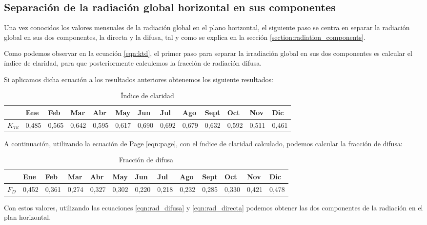\subsection{Separación de la radiación global horizontal en sus componentes}

Una vez conocidos los valores mensuales de la radiación global en el plano horizontal, el siguiente paso se centra en separar la radiación global en sus dos componentes, la directa y la difusa, tal y como se explica en la sección \ref{section:radiation_components}.

Como podemos observar en la ecuación \ref{eqn:ktd}, el primer paso para separar la irradiación global en sus dos componentes es calcular el índice de claridad, para que posteriormente calculemos la fracción de radiación difusa. 
\newpage

Si aplicamos dicha ecuación a los resultados anteriores obtenemos los siguiente resultados:

\begin{table}[ht]
\centering
\begin{tabular}{|l|l|l|l|l|l|l|l|l|l|l|l|l|}
\hline
    & Ene & Feb & Mar & Abr & May & Jun & Jul & Ago & Sept & Oct & Nov & Dic \\ \hline
$K_{Td}$ & 0,485 & 0,565 & 0,642 & 0,595 & 0,617 & 0,690 & 0,692 & 0,679 & 0,632 & 0,592 & 0,511  & 0,461  \\ \hline
\end{tabular}
\label{tab:clarity_index}
\caption{Índice de claridad}
\end{table}

A continuación, utilizando la ecuación de Page \ref{eqn:page}, con el índice de claridad calculado, podemos calcular la fracción de difusa:

\begin{table}[ht]
\centering
\begin{tabular}{|l|l|l|l|l|l|l|l|l|l|l|l|l|}
\hline
   		& Ene   & Feb   & Mar   & Abr   & May   & Jun   & Jul   & Ago   & Sept  & Oct   & Nov    & Dic    \\ \hline
$F_{D}$ & 0,452 & 0,361 & 0,274 & 0,327 & 0,302 & 0,220 & 0,218 & 0,232 & 0,285 & 0,330 & 0,421  & 0,478  \\ \hline
\end{tabular}
\label{tab:difuse_part}
\caption{Fracción de difusa}
\end{table}

Con estos valores, utilizando las ecuaciones \ref{eqn:rad_difusa} y \ref{eqn:rad_directa} podemos obtener las dos componentes de la radiación en el plan horizontal.


